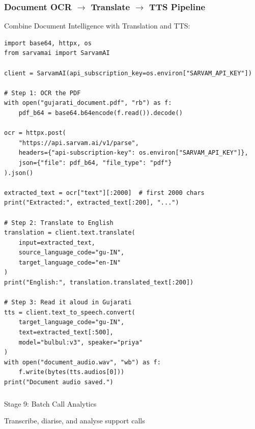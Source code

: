 \begin{frame}[fragile]\frametitle{Document OCR $\to$ Translate $\to$ TTS Pipeline}
Combine Document Intelligence with Translation and TTS:
\begin{lstlisting}
import base64, httpx, os
from sarvamai import SarvamAI

client = SarvamAI(api_subscription_key=os.environ["SARVAM_API_KEY"])

# Step 1: OCR the PDF
with open("gujarati_document.pdf", "rb") as f:
    pdf_b64 = base64.b64encode(f.read()).decode()

ocr = httpx.post(
    "https://api.sarvam.ai/v1/parse",
    headers={"api-subscription-key": os.environ["SARVAM_API_KEY"]},
    json={"file": pdf_b64, "file_type": "pdf"}
).json()

extracted_text = ocr["text"][:2000]  # first 2000 chars
print("Extracted:", extracted_text[:200], "...")

# Step 2: Translate to English
translation = client.text.translate(
    input=extracted_text,
    source_language_code="gu-IN",
    target_language_code="en-IN"
)
print("English:", translation.translated_text[:200])

# Step 3: Read it aloud in Gujarati
tts = client.text_to_speech.convert(
    target_language_code="gu-IN",
    text=extracted_text[:500],
    model="bulbul:v3", speaker="priya"
)
with open("document_audio.wav", "wb") as f:
    f.write(bytes(tts.audios[0]))
print("Document audio saved.")
\end{lstlisting}
\end{frame}


\begin{frame}[fragile]\frametitle{}
\begin{center}
{\Large Stage 9: Batch Call Analytics}

{\normalsize Transcribe, diarise, and analyse support calls}
\end{center}
\end{frame}

